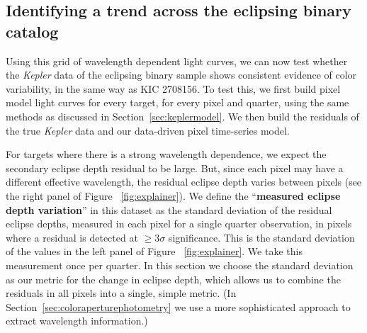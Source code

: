 \documentclass[iop]{emulateapj}
\newcommand{\kepler}{\emph{Kepler}\xspace}
\newcommand{\target}{KIC 2708156\xspace}
\begin{document}

\subsection{Identifying a trend across the eclipsing binary catalog}
\label{sec:resultebs}

Using this grid of wavelength dependent light curves, we can now test whether the \kepler data of the eclipsing binary sample shows consistent evidence of color variability, in the same way as \target. To test this, we first build pixel model light curves for every target, for every pixel and quarter, using the same methods as discussed in Section~\ref{sec:keplermodel}. We then build the residuals of the true \kepler data and our data-driven pixel time-series model. 

For targets where there is a strong wavelength dependence, we expect the secondary eclipse depth residual to be large. But, since each pixel may have a different effective wavelength, the residual eclipse depth varies between pixels (see the right panel of Figure ~\ref{fig:explainer}). We define the ``\textbf{measured eclipse depth variation}'' in this dataset as the standard deviation of the residual eclipse depths, measured in each pixel for a single quarter observation, in pixels where a residual is detected at $\ge$3$\sigma$ significance. This is the standard deviation of the values in the left panel of Figure ~\ref{fig:explainer}. We take this measurement once per quarter. In this section we choose the standard deviation as our metric for the change in eclipse depth, which allows us to combine the residuals in all pixels into a single, simple metric. (In Section~\ref{sec:coloraperturephotometry} we use a more sophisticated approach to extract wavelength information.)
\end{document}
